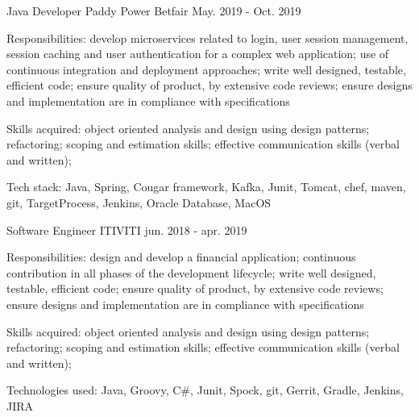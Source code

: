 \begin{cventries}
  \cventry
    {Java Developer} %
    {Paddy Power Betfair} %
    {} %
    {May. 2019 - Oct. 2019} %
    {
      \begin{cvitems} %
        \item {Responsibilities: develop microservices related to login, user session management, session caching and user authentication for a complex web application; use of continuous integration and deployment approaches; write well designed, testable, efficient code; ensure quality of product, by extensive code reviews; ensure designs and implementation are in compliance with specifications}
        \item {Skills acquired: object oriented analysis and design using design patterns; refactoring; scoping and estimation skills; effective communication skills (verbal and written);}
        \item {Tech stack: Java, Spring, Cougar framework, Kafka, Junit, Tomcat, chef, maven, git, TargetProcess, Jenkins, Oracle Database, MacOS}
      \end{cvitems}
    }

  \cventry
    {Software Engineer} %
    {ITIVITI} %
    {} %
    {jun. 2018 - apr. 2019} %
    {
      \begin{cvitems} %
        \item {Responsibilities: design and develop a financial application; continuous contribution in all phases of the development lifecycle; write well designed, testable, efficient code; ensure quality of product, by extensive code reviews; ensure designs and implementation are in compliance with specifications}
        \item {Skills acquired: object oriented analysis and design using design patterns; refactoring; scoping and estimation skills; effective communication skills (verbal and written);}
        \item {Technologies used: Java, Groovy, C\#, Junit, Spock, git, Gerrit, Gradle, Jenkins, JIRA}
      \end{cvitems}
    }


\end{cventries}
